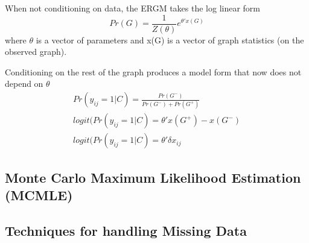 When not conditioning on data, the ERGM takes the log linear form
\begin{equation}
\label{eqn:ergm_general_form}
    Pr(G) = {\frac{1}{Z(\theta)}}e^{\theta'x(G)}
\end{equation}
where $\theta$ is a vector of parameters and x(G) is a vector of graph statistics (on the observed graph).

Conditioning on the rest of the graph produces a model form that now does not depend on $\theta$
\begin{equation}
\begin{aligned}
    Pr(y_{ij} = 1|C) = \frac{Pr(G^-)}{Pr(G^-) + Pr(G^+)} \\
    logit(Pr(y_{ij} = 1|C) = \theta'{x(G^+) - x(G^-)} \\
    \label{eqn:ergm_no_theta}
    logit(Pr(y_{ij} = 1|C) = \theta'\delta x_{ij}
\end{aligned}
\end{equation}
\subsection{Monte Carlo Maximum Likelihood Estimation (MCMLE)}

\subsection{Techniques for handling Missing Data}